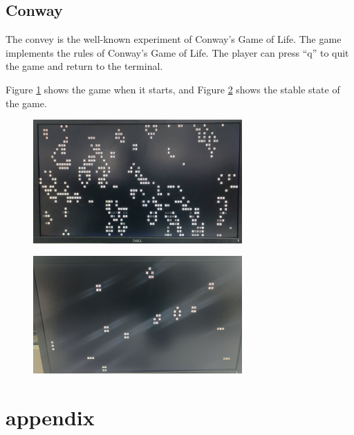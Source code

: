 \documentclass[
	a4paper, %
	11pt, %
]{CSUniSchoolLabReport}
\begin{document}
\subsection{Conway}
The convey is the well-known experiment of Conway's Game of Life. The game implements the rules of Conway's Game of Life. The player can press ``q'' to quit the game and return to the terminal.

Figure \ref{fig:image12} shows the game when it starts, and Figure \ref{fig:image13} shows the stable state of the game.
\begin{figure}[!htb]
    \centering
    \includegraphics[width=8cm]{image12.png}
    \label{fig:image12}
\end{figure}


\begin{figure}[!htb]
    \centering
    \includegraphics[width=8cm]{image13.png}
    \label{fig:image13}
\end{figure}


\newpage
\newpage
\section{appendix}
\end{document}
